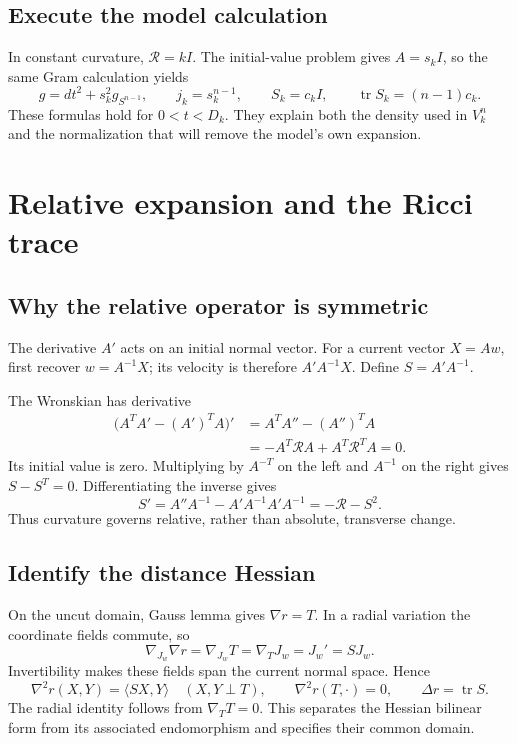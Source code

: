 \documentclass[12pt,reqno]{amsart}
\begin{document}
\subsection{Execute the model calculation}
In constant curvature, \(\mathcal R=kI\). The initial-value problem gives \(A=s_kI\), so the same Gram calculation yields
\[
g=dt^2+s_k^2g_{S^{n-1}},\qquad
j_k=s_k^{n-1},\qquad S_k=c_kI,\qquad \operatorname{tr}S_k=(n-1)c_k.
\]
These formulas hold for \(0<t<D_k\). They explain both the density used in \(V_k^n\) and the normalization that will remove the model's own expansion.

\section{Relative expansion and the Ricci trace}
\label{sec:trace}

\subsection{Why the relative operator is symmetric}
The derivative \(A'\) acts on an initial normal vector. For a current vector \(X=Aw\), first recover \(w=A^{-1}X\); its velocity is therefore \(A'A^{-1}X\). Define \(S=A'A^{-1}\).

The Wronskian has derivative
\[
\begin{aligned}
\bigl(A^TA'-(A')^TA\bigr)'
&=A^TA''-(A'')^TA\\
&=-A^T\mathcal RA+A^T\mathcal R^TA=0.
\end{aligned}
\]
Its initial value is zero. Multiplying by \(A^{-T}\) on the left and \(A^{-1}\) on the right gives \(S-S^T=0\). Differentiating the inverse gives
\[
S'=A''A^{-1}-A'A^{-1}A'A^{-1}
=-\mathcal R-S^2.
\]
Thus curvature governs relative, rather than absolute, transverse change.

\subsection{Identify the distance Hessian}
On the uncut domain, Gauss lemma gives \(\nabla r=T\). In a radial variation the coordinate fields commute, so
\[
\nabla_{J_w}\nabla r=\nabla_{J_w}T=\nabla_TJ_w=J_w'=SJ_w.
\]
Invertibility makes these fields span the current normal space. Hence
\[
\nabla^2r(X,Y)=\langle SX,Y\rangle\quad(X,Y\perp T),
\qquad \nabla^2r(T,\cdot)=0,\qquad \Delta r=\operatorname{tr}S.
\]
The radial identity follows from \(\nabla_TT=0\). This separates the Hessian bilinear form from its associated endomorphism and specifies their common domain.
\end{document}

